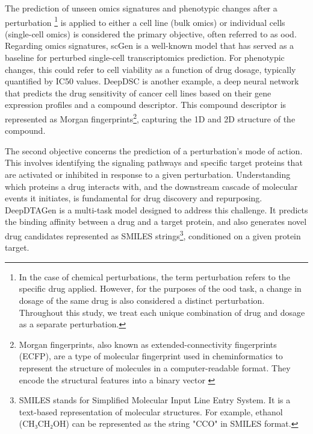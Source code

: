 \documentclass[12pt, a4paper]{article}
\begin{document}
The prediction of unseen omics signatures and phenotypic changes after a perturbation \footnote{In the case of chemical perturbations, the term perturbation refers to the specific drug applied. However, for the purposes of the \gls{ood} task, a change in dosage of the same drug is also considered a distinct perturbation. Throughout this study, we treat each unique combination of drug and dosage as a separate perturbation.} is applied to either a cell line (bulk omics) or individual cells (single-cell omics) is considered the primary objective, often referred to as \gls{ood}. Regarding omics signatures, scGen is a well-known model that has served as a baseline for perturbed single-cell transcriptomics prediction. For phenotypic changes, this could refer to cell viability as a function of drug dosage, typically quantified by IC50 values. DeepDSC \cite{li2019deepdsc} is another example, a deep neural network that predicts the drug sensitivity of cancer cell lines based on their gene expression profiles and a compound descriptor. This compound descriptor is represented as Morgan fingerprints\footnote{Morgan fingerprints, also known as extended-connectivity fingerprints (ECFP), are a type of molecular fingerprint used in cheminformatics to represent the structure of molecules in a computer-readable format. They encode the structural features into a binary vector \cite{morgan1965generation}}, capturing the 1D and 2D structure of the compound.



The second objective concerns the prediction of a perturbation's mode of action. This involves identifying the signaling pathways and specific target proteins that are activated or inhibited in response to a given perturbation. Understanding which proteins a drug interacts with, and the downstream cascade of molecular events it initiates, is fundamental for drug discovery and repurposing.
DeepDTAGen \cite{shah2025deepdtagen} is a multi-task model designed to address this challenge. It predicts the binding affinity between a drug and a target protein, and also generates novel drug candidates represented as SMILES strings\footnote{SMILES stands for Simplified Molecular Input Line Entry System. It is a text-based representation of molecular structures. For example, ethanol (CH₃CH₂OH) can be represented as the string "CCO" in SMILES format.}, conditioned on a given protein target.
\end{document}
